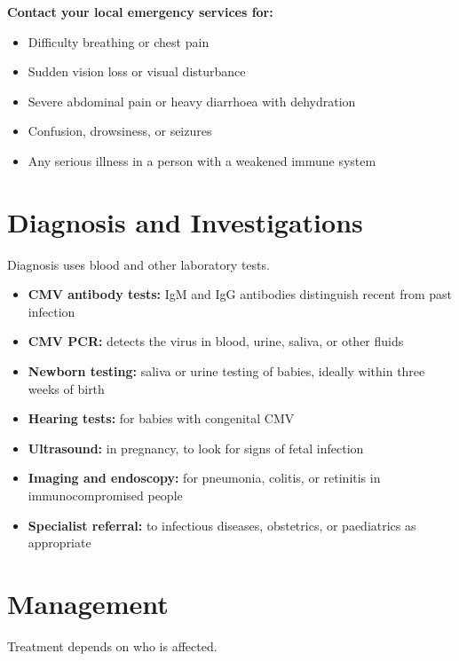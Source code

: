 \textbf{Contact your local emergency services for:}
\begin{itemize}
    \item Difficulty breathing or chest pain
    \item Sudden vision loss or visual disturbance
    \item Severe abdominal pain or heavy diarrhoea with dehydration
    \item Confusion, drowsiness, or seizures
    \item Any serious illness in a person with a weakened immune system
\end{itemize}

\section*{Diagnosis and Investigations}
Diagnosis uses blood and other laboratory tests.

\begin{itemize}
    \item \textbf{CMV antibody tests:} IgM and IgG antibodies distinguish recent from past infection
    \item \textbf{CMV PCR:} detects the virus in blood, urine, saliva, or other fluids
    \item \textbf{Newborn testing:} saliva or urine testing of babies, ideally within three weeks of birth
    \item \textbf{Hearing tests:} for babies with congenital CMV
    \item \textbf{Ultrasound:} in pregnancy, to look for signs of fetal infection
    \item \textbf{Imaging and endoscopy:} for pneumonia, colitis, or retinitis in immunocompromised people
    \item \textbf{Specialist referral:} to infectious diseases, obstetrics, or paediatrics as appropriate
\end{itemize}

\section*{Management}
Treatment depends on who is affected.

